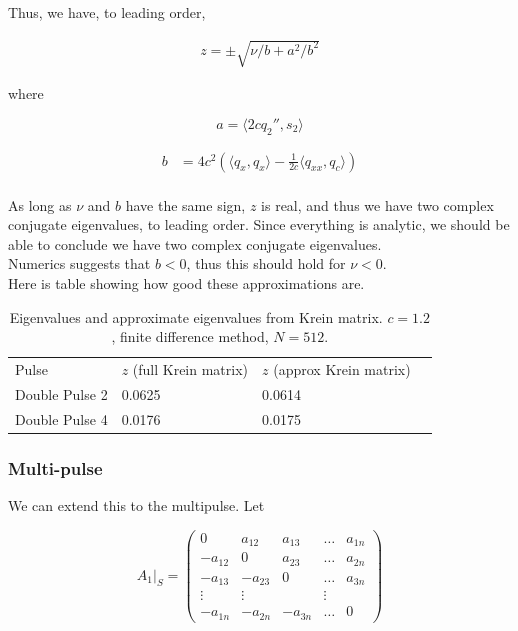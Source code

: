 \documentclass[12pt]{article}
\begin{document}
Thus, we have, to leading order,

\begin{align*}
z = \pm \sqrt{\nu / b + a^2/ b^2 }
\end{align*} 

where 

\[
a = \langle 2c q_2'', s_2 \rangle
\]

\begin{align*}
b &= 4 c^2 \left( \langle q_x, q_x \rangle - \frac{1}{2c} \langle q_{xx}, q_c \rangle \right)  \\
\end{align*}

As long as $\nu$ and $b$ have the same sign, $z$ is real, and thus we have two complex conjugate eigenvalues, to leading order. Since everything is analytic, we should be able to conclude we have two complex conjugate eigenvalues.\\

Numerics suggests that $b < 0$, thus this should hold for $\nu < 0$.\\

Here is table showing how good these approximations are.

\begin{table}[H]
\begin{tabular}{llll}
Pulse & $z$ (full Krein matrix) & $z$ (approx Krein matrix)\\
Double Pulse 2  & 0.0625 & 0.0614 \\
Double Pulse 4  & 0.0176 & 0.0175 \\
\end{tabular}
\caption{Eigenvalues and approximate eigenvalues from Krein matrix. $c = 1.2$, finite difference method, $N = 512$. }
\end{table}

\subsubsection{Multi-pulse}

We can extend this to the multipulse. Let

\[
A_1|_S = \begin{pmatrix} 0 & a_{12} & a_{13} & \dots & a_{1n} \\ 
-a_{12} & 0 & a_{23} & \dots & a_{2n} \\
-a_{13} & -a_{23} & 0 & \dots & a_{3n} \\
\vdots & \vdots & & \vdots \\
-a_{1n} & -a_{2n} & -a_{3n} & \dots & 0
\end{pmatrix} 
\]
\end{document}
